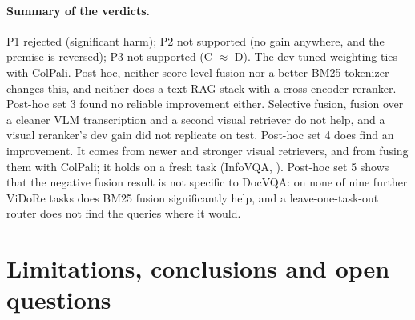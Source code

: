\documentclass[11pt,a4paper]{article}
\begin{document}
\paragraph{Summary of the verdicts.} P1 rejected (significant harm); P2 not supported (no gain anywhere, and the premise is reversed); P3 not supported (C $\approx$ D). The dev-tuned weighting ties with ColPali. Post-hoc, neither score-level fusion nor a better BM25 tokenizer changes this, and neither does a text RAG stack with a cross-encoder reranker. Post-hoc set 3 found no reliable improvement either. Selective fusion, fusion over a cleaner VLM transcription and a second visual retriever do not help, and a visual reranker's dev gain did not replicate on test. Post-hoc set 4 does find an improvement. It comes from newer and stronger visual retrievers, and from fusing them with ColPali; it holds on a fresh task (InfoVQA, \infoDelta{}). Post-hoc set 5 shows that the negative fusion result is not specific to DocVQA: on none of nine further ViDoRe tasks does BM25 fusion significantly help, and a leave-one-task-out router does not find the queries where it would.

\section{Limitations, conclusions and open questions}
\label{sec:limits}
\end{document}
